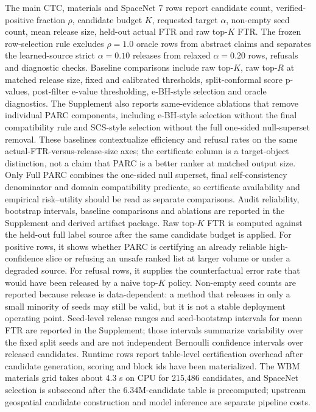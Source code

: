 \documentclass[10pt,twocolumn]{article}
\begin{document}
The main CTC, materials and SpaceNet 7 rows report candidate count, verified-positive fraction \(\rho\), candidate budget \(K\), requested target \(\alpha\), non-empty seed count, mean release size, held-out actual FTR and raw top-\(K\) FTR.
The frozen row-selection rule excludes \(\rho=1.0\) oracle rows from abstract claims and separates the learned-source strict \(\alpha=0.10\) releases from relaxed \(\alpha=0.20\) rows, refusals and diagnostic checks.
Baseline comparisons include raw top-\(K\), raw top-\(R\) at matched release size, fixed and calibrated thresholds, split-conformal score p-values, post-filter e-value thresholding, e-BH-style selection and oracle diagnostics.
The Supplement also reports same-evidence ablations that remove individual PARC components, including e-BH-style selection without the final compatibility rule and SCS-style selection without the full one-sided null-superset removal.
These baselines contextualize efficiency and refusal rates on the same actual-FTR-versus-release-size axes; the certificate column is a target-object distinction, not a claim that PARC is a better ranker at matched output size.
Only Full PARC combines the one-sided null superset, final self-consistency denominator and domain compatibility predicate, so certificate availability and empirical risk--utility should be read as separate comparisons.
Audit reliability, bootstrap intervals, baseline comparisons and ablations are reported in the Supplement and derived artifact package.
Raw top-\(K\) FTR is computed against the held-out full label source after the same candidate budget is applied.
For positive rows, it shows whether PARC is certifying an already reliable high-confidence slice or refusing an unsafe ranked list at larger volume or under a degraded source.
For refusal rows, it supplies the counterfactual error rate that would have been released by a naive top-\(K\) policy.
Non-empty seed counts are reported because release is data-dependent: a method that releases in only a small minority of seeds may still be valid, but it is not a stable deployment operating point.
Seed-level release ranges and seed-bootstrap intervals for mean FTR are reported in the Supplement; those intervals summarize variability over the fixed split seeds and are not independent Bernoulli confidence intervals over released candidates.
Runtime rows report table-level certification overhead after candidate generation, scoring and block ids have been materialized.
The WBM materials grid takes about 4.3 s on CPU for 215,486 candidates, and SpaceNet selection is subsecond after the 6.34M-candidate table is precomputed; upstream geospatial candidate construction and model inference are separate pipeline costs.
\end{document}
